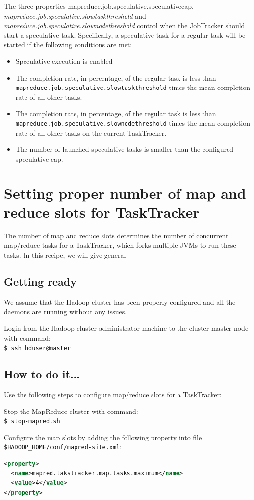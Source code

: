 The three properties mapreduce.job.speculative.speculativecap, \emph{mapreduce.job.speculative.slowtaskthreshold} and \emph{mapreduce.job.speculative.slownodethreshold} control when the JobTracker should start a speculative task. Specifically, a speculative task for a regular task will be started if the following conditions are met:
\begin{itemize}
  \item Speculative execution is enabled
  \item The completion rate, in percentage, of the regular task is less than \verb|mapreduce.job.speculative.slowtaskthreshold| times the mean completion rate of all other tasks.
  \item The completion rate, in percentage, of the regular task is less than \verb|mapreduce.job.speculative.slownodethreshold| times the mean completion rate of all other tasks on the current TaskTracker.
  \item The number of launched speculative tasks is smaller than the configured speculative cap.
\end{itemize}
\section{Setting proper number of map and reduce slots for TaskTracker}
The number of map and reduce slots determines the number of concurrent map/reduce tasks for a TaskTracker, which forks multiple JVMs to run these tasks. In this recipe, we will give general
\subsection*{Getting ready}
We assume that the Hadoop cluster has been properly configured and all the daemons are running without any issues.

Login from the Hadoop cluster administrator machine to the cluster master node with command: \\
\verb|$ ssh hduser@master|
\subsection*{How to do it...}
Use the following steps to configure map/reduce slots for a TaskTracker:

Stop the MapReduce cluster with command: \\
\verb|$ stop-mapred.sh|

Configure the map slots by adding the following property into file \verb|$HADOOP_HOME/conf/mapred-site.xml|:
\lstset{style=bashstyle}
\begin{lstlisting}[language=XML]
<property>
  <name>mapred.takstracker.map.tasks.maximum</name>
  <value>4</value>
</property>
\end{lstlisting}

